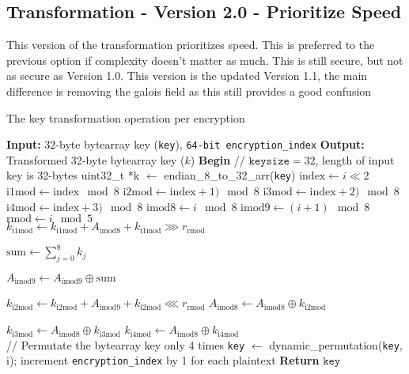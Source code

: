 \documentclass[fleqn, a4paper,12pt]{article}
\newcommand{\COMMENT}[1]{\State \textcolor[HTML]{003e57}{// #1}}
\begin{document}
\subsection{Transformation - Version 2.0 - Prioritize Speed}

This version of the transformation prioritizes speed. This is preferred to the previous option if complexity doesn't matter as much. This is still secure, but not as secure as Version 1.0. This version is the updated Version 1.1, the main difference is removing the galois field as this still provides a good confusion

\begin{algorithm}[H] %
\caption{The key transformation operation per encryption}
\begin{algorithmic}[1]  %
\State \textbf{Input:} 32-byte bytearray key (\texttt{key}), \texttt{64-bit encryption\_index}
\State \textbf{Output:} Transformed 32-byte bytearray key ($k$)
\State \textbf{Begin}
\COMMENT{$\texttt{keysize} = 32$, length of input key is 32-bytes}
\State uint32\_t *k $\gets$ endian\_8\_to\_32\_arr(\texttt{key})
	\State $\mathrm{index} \gets i \ll 2$
	\State $\mathrm{i1mod} \gets \mathrm{index} \mod 8$
	\State $\mathrm{i2mod} \gets \mathrm{index}+1) \mod 8$
	\State $\mathrm{i3mod} \gets \mathrm{index}+2) \mod 8$
	\State $\mathrm{i4mod} \gets \mathrm{index}+3) \mod 8$
	\State $\mathrm{imod8} \gets i \mod 8$
	\State $\mathrm{imod9} \gets (i+1) \mod 8$
	\State $\mathrm{rmod} \gets i \mod 5$ \\
	
	\State $k_\mathrm{i1mod} \gets k_\mathrm{i1mod} + A_\mathrm{imod8} + k_\mathrm{i1mod} \ggg r_\mathrm{rmod}$

	\State $ \mathrm{sum} \gets \displaystyle \sum_{j=0}^8 k_j$

	\State $A_\mathrm{imod9} \gets A_\mathrm{imod9} \oplus \mathrm{sum}$

	\State $k_\mathrm{i2mod} \gets k_\mathrm{i2mod} + A_\mathrm{imod9} + k_\mathrm{i2mod} \lll r_\mathrm{rmod}$
	\State $A_\mathrm{imod8} \gets A_\mathrm{imod8} \oplus k_\mathrm{i2mod}$

	\State $k_\mathrm{i3mod} \gets A_\mathrm{imod8} \oplus k_\mathrm{i3mod}$
	\State $k_\mathrm{i4mod} \gets A_\mathrm{imod8} \oplus k_\mathrm{i4mod}$ \\

	\COMMENT{Permutate the bytearray key only 4 times}
		\State \texttt{key} $\gets$ dynamic\_permutation(\texttt{key}, i);
	\EndIf
\EndFor
\State increment \texttt{encryption\_index} by 1 for each plaintext
\State \textbf{Return} $\texttt{key}$
\end{algorithmic}
\end{algorithm}
\end{document}
